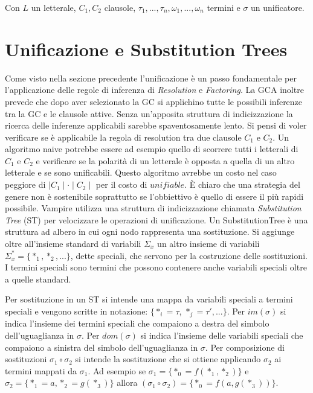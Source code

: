 \documentclass[./main.tex]{subfiles}
\begin{document}
Con $L$ un letterale, $C_1, C_2$ clausole, $\tau_1, ..., \tau_n, \omega_1, ..., \omega_n$ termini e $\sigma$ un unificatore.

\section{Unificazione e Substitution Trees} \label{sec:vampire_unification}
Come visto nella sezione precedente l'unificazione è un passo fondamentale per l'applicazione delle regole di inferenza di 
\textit{Resolution} e \textit{Factoring}. La GCA inoltre prevede che dopo aver selezionato la GC 
si applichino tutte le possibili inferenze tra la GC e le clausole attive. 
Senza un'apposita struttura di indicizzazione la ricerca delle inferenze applicabili sarebbe spaventosamente lento.
Si pensi di voler verificare se è applicabile la regola di resolution tra due clausole $C_1$ e $C_2$.
Un algoritmo naive potrebbe essere ad esempio quello di scorrere tutti i letterali di $C_1$ e $C_2$ e verificare se 
la polarità di un letterale è opposta a quella di un altro letterale e se sono unificabili. 
Questo algoritmo avrebbe un costo nel caso peggiore di $\mid C_1 \mid \cdot \mid C_2 \mid$ per il costo di $unifiable$.
È chiaro che una strategia del genere non è sostenibile soprattutto se l'obbiettivo è quello di essere il più rapidi possibile.
Vampire utilizza una struttura di indicizzazione chiamata \textit{Substitution Tree} (ST) per velocizzare le operazioni di unificazione.
Un SubstitutionTree è una struttura ad albero in cui ogni nodo rappresenta una sostituzione.
Si aggiunge oltre all'insieme standard di variabili $\Sigma_x$ un altro insieme di variabili $\Sigma_x^* = \{*_1, *_2, ...\}$, dette speciali, che servono per la costruzione delle sostituzioni.
I termini speciali sono termini che possono contenere anche variabili speciali oltre a quelle standard.

Per sostituzione in un ST si intende una mappa da variabili speciali a termini speciali e vengono scritte in notazione:
$\{*_i = \tau$, $*_j = \tau', ... \}$. 
Per $im(\sigma)$ si indica l'insieme dei termini speciali che compaiono a destra del simbolo dell'uguaglianza in $\sigma$.
Per $dom(\sigma)$ si indica l'insieme delle variabili speciali che compaiono a sinistra del simbolo dell'uguaglianza in $\sigma$.
Per composizione di sostituzioni $\sigma_1 \circ \sigma_2$ si intende la sostituzione che si ottiene applicando $\sigma_2$ 
ai termini mappati da $\sigma_1$. Ad esempio se $\sigma_1 = \{*_0 = f(*_1, *_2)\}$ e $\sigma_2 = \{*_1 = a, *_2 = g(*_3)\}$ allora
$(\sigma_1 \circ \sigma_2) = \{*_0 = f(a, g(*_3))\}$.
\end{document}
